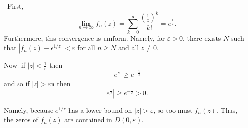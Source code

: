 \documentclass[12pt]{Qual}
\begin{document}
\begin{solution}$\,$
First, $$\lim_{n\to\infty}f_n(z)=\sum_{k=0}^\infty\frac{\left(\frac{1}{z}\right)^k}{k!}=e^\frac{1}{z}.$$ Furthermore, this convergence is uniform. Namely, for $\varepsilon>0$, there exists $N$ such that $|f_n(z)-e^{1/z}|<\varepsilon$ for all $n\ge N$ and all $z\not=0.$

Now, if $|z|<\frac{1}{\varepsilon}$ then $$|e^z|\ge e^{-\frac{1}{\varepsilon}}$$ and so if $|z|>\varepsilon$n then $$|e^{\frac{1}{z}}|\ge e^{-\frac{1}{\varepsilon}}>0.$$

Namely, because $e^{1/z}$ has a lower bound on $|z|>\varepsilon$, so too must $f_n(z)$. Thus, the zeros of $f_n(z)$ are contained in $D(0,\varepsilon).$
\end{solution}
\end{document}
